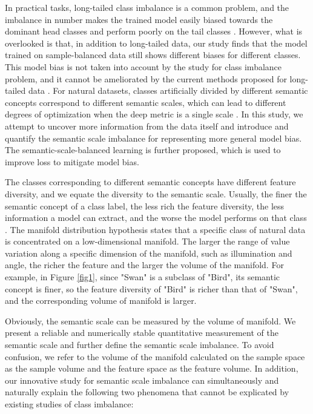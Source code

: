 \documentclass[10pt]{article} %
\begin{document}
In practical tasks, long-tailed class imbalance is a common problem, and the imbalance in number makes the trained model easily biased towards the dominant head classes and perform poorly on the tail classes \cite{paper1,paper2}. However, what is overlooked is that, in addition to long-tailed data, our study finds that the model trained on sample-balanced data still shows different biases for different classes. This model bias is not taken into account by the study for class imbalance problem, and it cannot be ameliorated by the current methods proposed for long-tailed data \cite{paper3,paper4,paper5,paper6}. For natural datasets, classes artificially divided by different semantic concepts correspond to different semantic scales, which can lead to different degrees of optimization when the deep metric is a single scale \citep{paper23}. In this study, we attempt to uncover more information from the data itself and introduce and quantify the semantic scale imbalance for representing more general model bias. The semantic-scale-balanced learning is further proposed, which is used to improve loss to mitigate model bias.


The classes corresponding to different semantic concepts have different feature diversity, and we equate the diversity to the semantic scale. Usually, the finer the semantic concept of a class label, the less rich the feature diversity, the less information a model can extract, and the worse the model performs on that class \cite{paper14,paper23,paper13,paper19,paper20,paper21}. The manifold distribution hypothesis \cite {paper7} states that a specific class of natural data is concentrated on a low-dimensional manifold. The larger the range of value variation along a specific dimension of the manifold, such as illumination and angle, the richer the feature and the larger the volume of the manifold. For example, in Figure \ref{fig1}, since "Swan" is a subclass of "Bird", its semantic concept is finer, so the feature diversity of "Bird" is richer than that of "Swan", and the corresponding volume of manifold is larger. 


Obviously, the semantic scale can be measured by the volume of manifold. We present a reliable and numerically stable quantitative measurement of the semantic scale and further define the semantic scale imbalance. To avoid confusion, we refer to the volume of the manifold calculated on the sample space as the sample volume and the feature space as the feature volume. In addition, our innovative study for semantic scale imbalance can simultaneously and naturally explain the following two phenomena that cannot be explicated by existing studies of class imbalance:
\end{document}
